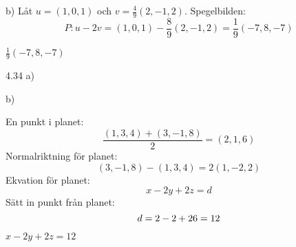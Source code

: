 \begin{task}{b)}
	Låt $u=(1,0,1)$ och $v=\frac{4}{9}(2,-1,2)$.
	Spegelbilden:
	\[P:u-2v=(1,0,1)-\frac{8}{9}(2,-1,2)=
	\frac{1}{9}(-7,8,-7)\]

	\ans $\frac{1}{9}(-7,8,-7)$
\end{task}

\begin{task}{4.32}
	\ans
\end{task}

\begin{task}{4.33}
	\ans
\end{task}

\begin{task}{4.34 a)}
	\ans
\end{task}

\begin{task}{b)}
	\ans
\end{task}

\begin{task}{4.35}
	\ans
\end{task}

\begin{task}{4.36}
	\ans
\end{task}

\begin{task}{4.37}
	\ans
\end{task}

\begin{task}{4.38}
	\ans
\end{task}

\begin{task}{4.39}
	\ans
\end{task}

\begin{task}{4.40}
	\ans
\end{task}

\begin{task}{4.41}
	\ans
\end{task}

\begin{task}{4.42}
	En punkt i planet:
	\[\frac{(1,3,4)+(3,-1,8)}{2}=(2,1,6)\]
	Normalriktning för planet:
	\[(3,-1,8)-(1,3,4)=2(1,-2,2)\]
	Ekvation för planet:
	\[x-2y+2z=d\]
	Sätt in punkt från planet:
	\[d=2-2+2\*6=12\]

	\ans $x-2y+2z=12$
\end{task}

\begin{task}{4.43}
	\ans
\end{task}

\begin{task}{4.44}
	\ans
\end{task}

\begin{task}{4.45}
	\ans
\end{task}

\begin{task}{4.46}
	\ans
\end{task}

\begin{task}{4.47}
	\ans
\end{task}

\begin{task}{4.48}
	\ans
\end{task}

\begin{task}{4.49}
	\ans
\end{task}